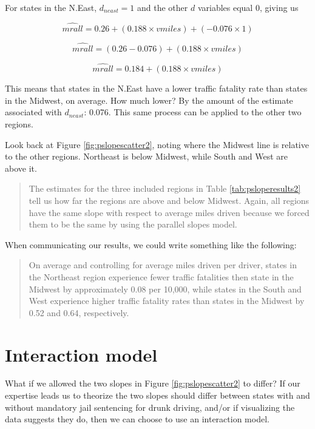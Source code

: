 \documentclass[
]{book}
\begin{document}
For states in the N.East, \(d_{neast}=1\) and the other \(d\) variables equal 0, giving us

\[\hat{mrall} = 0.26 + (0.188 \times vmiles) + (-0.076 \times 1)\]

\[\hat{mrall} = (0.26 - 0.076) + (0.188 \times vmiles)\]

\[\hat{mrall} = 0.184 + (0.188 \times vmiles)\]

This means that states in the N.East have a lower traffic fatality rate than states in the Midwest, on average. How much lower? By the amount of the estimate associated with \(d_{neast}\): 0.076. This same process can be applied to the other two regions.

Look back at Figure \ref{fig:pslopescatter2}, noting where the Midwest line is relative to the other regions. Northeast is below Midwest, while South and West are above it.

\begin{quote}
The estimates for the three included regions in Table \ref{tab:psloperesults2} tell us how far the regions are above and below Midwest. Again, all regions have the same slope with respect to average miles driven because we forced them to be the same by using the parallel slopes model.
\end{quote}

When communicating our results, we could write something like the following:

\begin{quote}
On average and controlling for average miles driven per driver, states in the Northeast region experience fewer traffic fatalities then state in the Midwest by approximately 0.08 per 10,000, while states in the South and West experience higher traffic fatality rates than states in the Midwest by 0.52 and 0.64, respectively.
\end{quote}

\hypertarget{interaction-model}{%
\section{Interaction model}\label{interaction-model}}

What if we allowed the two slopes in Figure \ref{fig:pslopescatter2} to differ? If our expertise leads us to theorize the two slopes should differ between states with and without mandatory jail sentencing for drunk driving, and/or if visualizing the data suggests they do, then we can choose to use an interaction model.
\end{document}
